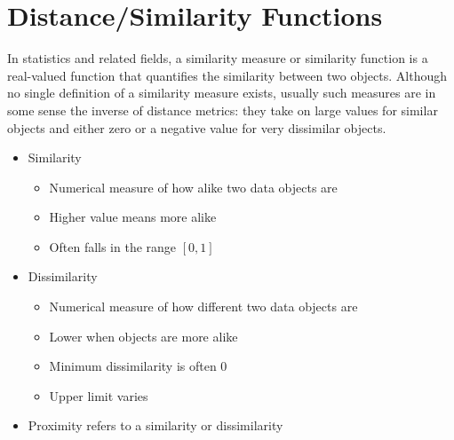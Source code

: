 \section{Distance/Similarity Functions}
In statistics and related fields, a similarity measure or similarity function is 
a real-valued function that quantifies the similarity between two objects. 
Although no single definition of a similarity measure exists, usually such 
measures are in some sense the inverse of distance metrics: they take on large 
values for similar objects and either zero or a negative value for very 
dissimilar objects.\cite{enwiki:similarity}

\begin{itemize}
    \item Similarity
    \begin{itemize}
        \item Numerical measure of how alike two data objects are
        \item Higher value means more alike
        \item Often falls in the range $[0,1]$
    \end{itemize}
    \item Dissimilarity
    \begin{itemize}
        \item Numerical measure of how different two data objects are
        \item Lower when objects are more alike
        \item Minimum dissimilarity is often 0
        \item Upper limit varies
    \end{itemize}
    \item Proximity refers to a similarity or dissimilarity
\end{itemize}

